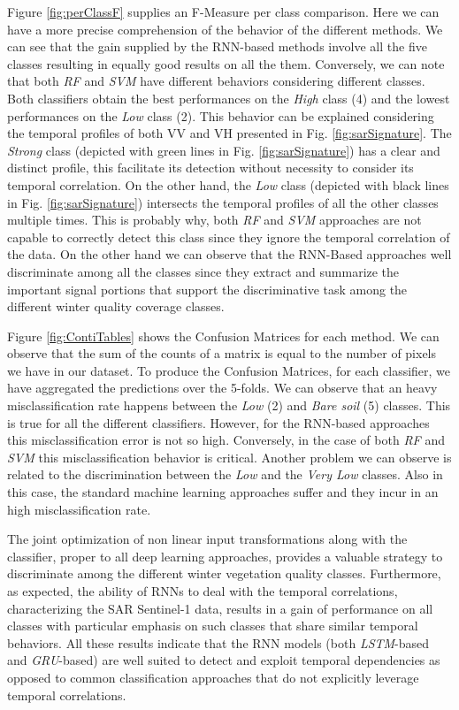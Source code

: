\documentclass[journal, onecolumn]{IEEEtran}
\begin{document}
Figure \ref{fig:perClassF} supplies an F-Measure per class comparison. Here we can have a more precise comprehension of the behavior of the different methods. We can see that the gain supplied by the RNN-based methods involve all the five classes resulting in equally good results on all the them. Conversely, we can note that both \textit{RF} and \textit{SVM} have different behaviors considering different classes. Both classifiers obtain the best performances on the \textit{High} class (4) and the lowest performances on the \textit{Low} class (2). 
This behavior can be explained considering the temporal profiles of both VV and VH presented in Fig.  \ref{fig:sarSignature}. The \textit{Strong} class (depicted with green lines in Fig.  \ref{fig:sarSignature}) has a clear and distinct profile, this facilitate its detection without necessity to consider its temporal correlation. On the other hand, the \textit{Low} class (depicted with black lines in Fig. \ref{fig:sarSignature}) intersects the temporal profiles of all the other classes multiple times. This is probably why, both \textit{RF} and \textit{SVM} approaches are not capable to correctly detect this class since they ignore the temporal correlation of the data. 
On the other hand we can observe that the RNN-Based approaches well discriminate among all the classes since they extract and summarize the important signal portions that support the discriminative task among the different winter quality coverage classes.

Figure \ref{fig:ContiTables} shows the Confusion Matrices for each method. We can observe that the sum of the counts of a matrix is equal to the number of pixels we have in our dataset. To produce the Confusion Matrices, for each classifier, we have aggregated the predictions over the 5-folds. 
We can observe that an heavy misclassification rate happens between the \textit{Low} (2) and \textit{Bare soil} (5) classes. This is true for all the different classifiers. However, for the RNN-based approaches this misclassification error is not so high. Conversely, in the case of both \textit{RF} and \textit{SVM} this misclassification behavior is critical. Another problem we can observe is related to the discrimination between the \textit{Low} and the \textit{Very Low} classes. Also in this case, the standard machine learning approaches suffer and they incur in an high misclassification rate.

The joint optimization of non linear input transformations along with the classifier, proper to all deep learning approaches, provides a valuable strategy to discriminate among the different winter vegetation quality classes. Furthermore, as expected, the ability of RNNs to deal with the temporal correlations, characterizing the SAR Sentinel-1 data, results in a gain of performance on all classes with particular emphasis on such classes that share similar temporal behaviors. All these results indicate that the RNN models (both \textit{LSTM}-based and \textit{GRU}-based) are well suited to detect and exploit temporal dependencies as opposed to common classification approaches that do not explicitly leverage temporal correlations. 
\end{document}
